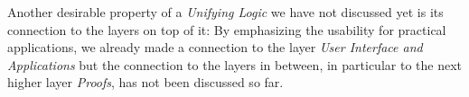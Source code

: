  Another desirable property of a \emph{Unifying Logic} we have not discussed yet is its connection to the layers on top of it:
 By emphasizing the usability for practical applications, 
 we already made a connection 
 to the layer \emph{User Interface and Applications} but the connection to the layers in between, in particular to the next higher layer \emph{Proofs}, has not been discussed so far.
%
